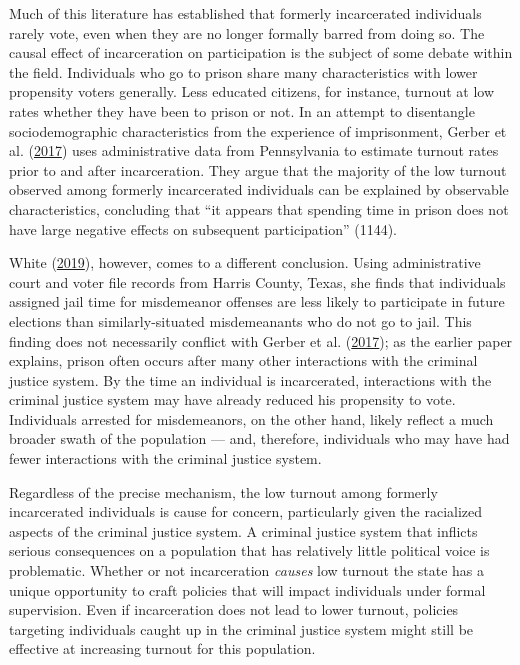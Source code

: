\documentclass[
  12pt,
]{article}
\begin{document}
Much of this literature has established that formerly incarcerated individuals rarely vote, even when they are no longer formally barred from doing so. The causal effect of incarceration on participation is the subject of some debate within the field. Individuals who go to prison share many characteristics with lower propensity voters generally. Less educated citizens, for instance, turnout at low rates whether they have been to prison or not. In an attempt to disentangle sociodemographic characteristics from the experience of imprisonment, Gerber et al. (\protect\hyperlink{ref-Gerber2017}{2017}) uses administrative data from Pennsylvania to estimate turnout rates prior to and after incarceration. They argue that the majority of the low turnout observed among formerly incarcerated individuals can be explained by observable characteristics, concluding that ``it appears that spending time in prison does not have large negative effects on subsequent participation'' (1144).

White (\protect\hyperlink{ref-White2019}{2019}), however, comes to a different conclusion. Using administrative court and voter file records from Harris County, Texas, she finds that individuals assigned jail time for misdemeanor offenses are less likely to participate in future elections than similarly-situated misdemeanants who do not go to jail. This finding does not necessarily conflict with Gerber et al. (\protect\hyperlink{ref-Gerber2017}{2017}); as the earlier paper explains, prison often occurs after many other interactions with the criminal justice system. By the time an individual is incarcerated, interactions with the criminal justice system may have already reduced his propensity to vote. Individuals arrested for misdemeanors, on the other hand, likely reflect a much broader swath of the population --- and, therefore, individuals who may have had fewer interactions with the criminal justice system.

Regardless of the precise mechanism, the low turnout among formerly incarcerated individuals is cause for concern, particularly given the racialized aspects of the criminal justice system. A criminal justice system that inflicts serious consequences on a population that has relatively little political voice is problematic. Whether or not incarceration \emph{causes} low turnout the state has a unique opportunity to craft policies that will impact individuals under formal supervision. Even if incarceration does not lead to lower turnout, policies targeting individuals caught up in the criminal justice system might still be effective at increasing turnout for this population.
\end{document}

